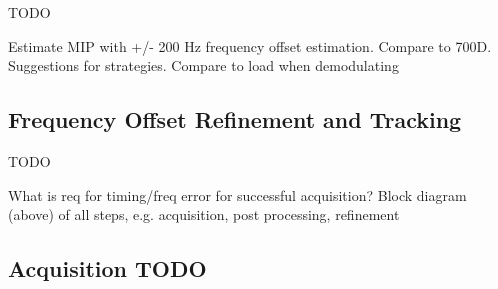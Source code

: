 \documentclass{article}
\begin{document}
{TODO 

Estimate MIP with +/- 200 Hz frequency offset estimation. Compare to 700D.  Suggestions for strategies.
Compare to load when demodulating

\subsection{Frequency Offset Refinement and Tracking}

TODO

What is req for timing/freq error for successful acquisition?
Block diagram (above) of all steps, e.g. acquisition, post processing, refinement


\subsection{Acquisition TODO}

}
\end{document}

